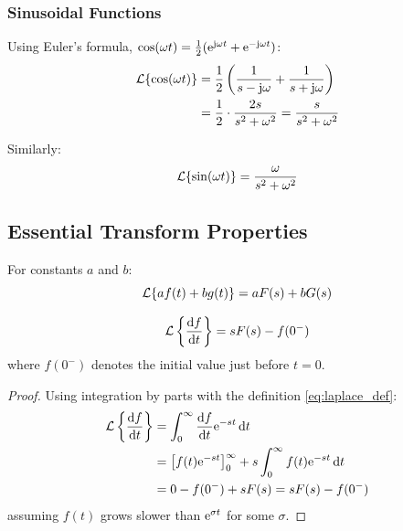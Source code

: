 \subsubsection{Sinusoidal Functions}

Using Euler's formula, $\cos(\omega t) = \frac{1}{2}(\mathrm{e}^{\mathrm{j}\omega t} + \mathrm{e}^{-\mathrm{j}\omega t})$:
\begin{align}
\mathcal{L}\{\cos(\omega t)\} &= \frac{1}{2}\left(\frac{1}{s - \mathrm{j}\omega} + \frac{1}{s + \mathrm{j}\omega}\right) \nonumber \\
&= \frac{1}{2}\cdot\frac{2s}{s^2 + \omega^2} = \frac{s}{s^2 + \omega^2}
\label{eq:cos_transform}
\end{align}

Similarly:
\begin{equation}
\mathcal{L}\{\sin(\omega t)\} = \frac{\omega}{s^2 + \omega^2}
\label{eq:sin_transform}
\end{equation}

\subsection{Essential Transform Properties}

\begin{property}[Linearity]
For constants $a$ and $b$:
\begin{equation}
\mathcal{L}\{af(t) + bg(t)\} = aF(s) + bG(s)
\end{equation}
\end{property}

\begin{property}
\label{prop:differentiation}
\begin{equation}
\mathcal{L}\left\{\frac{\mathrm{d} f}{\mathrm{d} t}\right\} = sF(s) - f(0^-)
\label{eq:diff_property}
\end{equation}
where $f(0^-)$ denotes the initial value just before $t = 0$.
\end{property}

\begin{proof}
Using integration by parts with the definition \eqref{eq:laplace_def}:
\begin{align}
\mathcal{L}\left\{\frac{\mathrm{d} f}{\mathrm{d} t}\right\} &= \int_0^{\infty} \frac{\mathrm{d} f}{\mathrm{d} t}\mathrm{e}^{-st}\,\mathrm{d} t \nonumber \\
&= \left[f(t)\mathrm{e}^{-st}\right]_0^{\infty} + s\int_0^{\infty} f(t)\mathrm{e}^{-st}\,\mathrm{d} t \nonumber \\
&= 0 - f(0^-) + sF(s) = sF(s) - f(0^-)
\end{align}
assuming $f(t)$ grows slower than $\mathrm{e}^{\sigma t}$ for some $\sigma$.
\end{proof}

